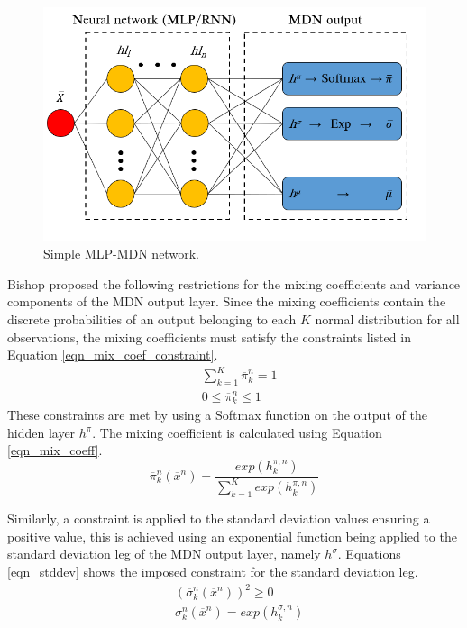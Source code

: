 \documentclass[a4paper,fleqn]{cas-dc}
\begin{document}
\begin{figure}[h!]
	\centering
		\includegraphics[scale=0.5]{MDN_SCHEMATIC}
	  \caption{Simple MLP-MDN network.}\label{fig_mdn_schematic}
\end{figure}

Bishop \cite{bishop1994} proposed the following restrictions for the mixing coefficients and variance components of the MDN output layer. Since the mixing coefficients contain the discrete probabilities of an output belonging to each $K$ normal distribution for all observations, the mixing coefficients must satisfy the constraints listed in Equation \ref{eqn_mix_coef_constraint}.
\begin{equation}\label{eqn_mix_coef_constraint}
\begin{split}
&\sum_{k=1}^K\overline{\pi}_k^n=1\\
&0\leq\overline{\pi}_k^n\leq1
\end{split}
\end{equation}
These constraints are met by using a Softmax function on the output of the hidden layer $h^{\pi}$. The mixing coefficient is calculated using Equation \ref{eqn_mix_coeff}.
\begin{equation}\label{eqn_mix_coeff}
\overline{\pi}_k^n(\overline{x}^n)=\frac{exp(h_k^{\pi,n})}{\sum_{k=1}^Kexp(h_k^{\pi,n})}
\end{equation}

Similarly, a constraint is applied to the standard deviation values ensuring a positive value, this is achieved using an exponential function being applied to the standard deviation leg of the MDN output layer, namely $h^{\sigma}$. Equations \ref{eqn_stddev} shows the imposed constraint for the standard deviation leg.\\
\begin{equation}\label{eqn_stddev}
\begin{split}
&(\overline{\sigma}^n_k(\overline{x}^n))^2\geq 0\\
&\sigma_k^n(\overline{x}^n)=exp(h_k^{\sigma,n})
\end{split}
\end{equation}
\end{document}
